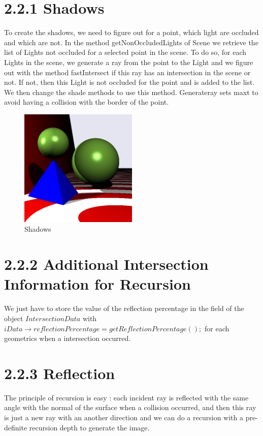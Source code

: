 \documentclass[10pt,a4paper]{report}
\begin{document}
\section*{2.2.1   Shadows}
To create the shadows, we need to figure out for a point, which light are occluded and which are not. In the method getNonOccludedLights of Scene we retrieve the list of Lights not occluded for a selected point in the scene. To do so, for each Lights in the scene, we generate a ray from the point to the Light and we figure out with the method fastIntersect if this ray has an intersection in the scene or not. If not, then this Light is not occluded for the point and is added to the list. We then change the shade methods to use this method. Generateray sets maxt to avoid having a collision with the border of the point.
\begin{figure}[h!]
\caption{Shadows}
  \centering
    \includegraphics[width=0.5\textwidth]{02_Exc_Raytracing_Framework/2_2_1.png}
\end{figure}
\section*{2.2.2   Additional Intersection Information for Recursion}
We just have to store the value of the reflection percentage in the field of the object $IntersectionData$ with $iData\rightarrow reflectionPercentage = getReflectionPercentage();$ for each geometrics when a intersection occurred.

\section*{2.2.3   Reflection}
The principle of recursion is easy : each incident ray is reflected with the same angle with the normal of the surface when a collision occurred, and then this ray is just a new ray with an another direction and we can do a recursion with a pre-definite recursion depth to generate the image.
\end{document}
